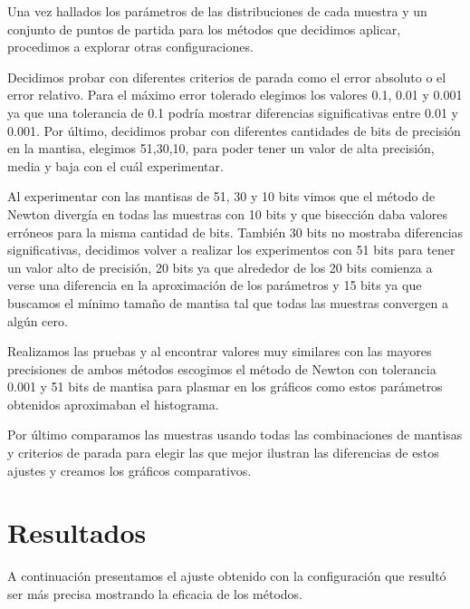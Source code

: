 \documentclass[a4paper,10pt,twoside]{article}
\newcommand{\incluircsv}[4]{
	\begin{center}
		\csvreader[tabular=#2,
		           table head=\hline #3 \\\hline,
		           late after line=\\,
		           late after last line=\\\hline,
		           head to column names]
		          {#1}{}{#4}
	\end{center}              
}
\newcommand{\nombremuestra}[1]{%
	\let \nombre #1%
	\StrSubstitute{\nombre}{data/}{}[\nombre]%
	\StrSubstitute{\nombre}{data/tag}{}[\nombre]%
	\StrSubstitute{\nombre}{.txt}{}[\nombre]%
	\nombre%
}
\begin{document}
Una vez hallados los parámetros de las distribuciones de cada muestra y un
conjunto de puntos de partida para los métodos que decidimos aplicar,
procedimos a explorar otras configuraciones. 

Decidimos probar con diferentes criterios de parada como el error absoluto o el error relativo. Para el máximo error
tolerado elegimos los valores 0.1, 0.01 y 0.001 ya que una tolerancia de 0.1 podría mostrar diferencias significativas entre 0.01 y 0.001. Por último, decidimos probar con diferentes cantidades de bits de precisión en la mantisa, elegimos 51,30,10, para poder tener un valor de alta precisión, media y baja con el cuál experimentar.

Al experimentar con las mantisas de 51, 30 y 10 bits vimos que el método de Newton divergía en todas las muestras con 10 bits y que bisección daba valores erróneos para la misma cantidad de bits. También 30 bits no mostraba diferencias significativas, decidimos volver a realizar los experimentos con 51 bits para tener un valor alto de precisión, 20 bits ya que alrededor de los 20 bits comienza a verse una diferencia en la aproximación de los parámetros y 15 bits ya que buscamos el mínimo tamaño de mantisa tal que todas las muestras convergen a algún cero.

Realizamos las pruebas y al encontrar valores muy similares con las mayores precisiones de ambos métodos escogimos el método de Newton con tolerancia 0.001 y 51 bits de mantisa para plasmar en los gráficos como estos parámetros obtenidos aproximaban el histograma.

Por último comparamos las muestras usando todas las combinaciones de mantisas y criterios de parada para elegir las que mejor ilustran las diferencias de estos ajustes y creamos los gráficos comparativos.



\section{Resultados}

A continuación presentamos el ajuste obtenido con la configuración que resultó ser más precisa mostrando la eficacia de los métodos.

\incluircsv{referencia.csv}
           {|c|c|c|c|}
           {Muestra & $\sigma$ & $\beta$ & $\lambda$}
           {\nombremuestra{\Muestra} & \Sigma & \Beta & \Lambda}
\end{document}
